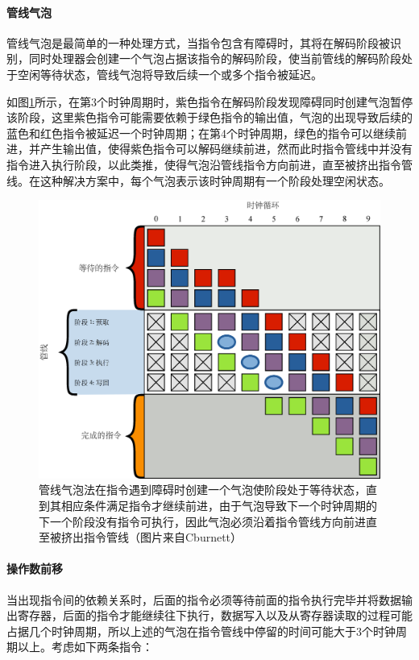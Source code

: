\paragraph{管线气泡}
管线气泡是最简单的一种处理方式，当指令包含有障碍时，其将在解码阶段被识别，同时处理器会创建一个气泡占据该指令的解码阶段，使当前管线的解码阶段处于空闲等待状态，管线气泡将导致后续一个或多个指令被延迟。

如图\ref{f:rp-pipeline-bubble}所示，在第3个时钟周期时，紫色指令在解码阶段发现障碍同时创建气泡暂停该阶段，这里紫色指令可能需要依赖于绿色指令的输出值，气泡的出现导致后续的蓝色和红色指令被延迟一个时钟周期；在第4个时钟周期，绿色的指令可以继续前进，并产生输出值，使得紫色指令可以解码继续前进，然而此时指令管线中并没有指令进入执行阶段，以此类推，使得气泡沿管线指令方向前进，直至被挤出指令管线。在这种解决方案中，每个气泡表示该时钟周期有一个阶段处理空闲状态。

\begin{figure}
	\includegraphics[width=\textwidth]{figures/rp/Pipeline-bubble}
	\caption{管线气泡法在指令遇到障碍时创建一个气泡使阶段处于等待状态，直到其相应条件满足指令才继续前进，由于气泡导致下一个时钟周期的下一个阶段没有指令可执行，因此气泡必须沿着指令管线方向前进直至被挤出指令管线（图片来自Cburnett）}
	\label{f:rp-pipeline-bubble}
\end{figure}




\paragraph{操作数前移}
当出现指令间的依赖关系时，后面的指令必须等待前面的指令执行完毕并将数据输出寄存器，后面的指令才能继续往下执行，数据写入以及从寄存器读取的过程可能占据几个时钟周期，所以上述的气泡在指令管线中停留的时间可能大于3个时钟周期以上。考虑如下两条指令：

